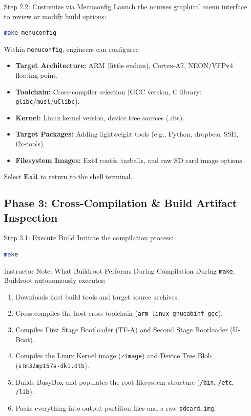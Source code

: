 \begin{cmdbox}{Step 2.2: Customize via Menuconfig}
Launch the ncurses graphical menu interface to review or modify build options:
\begin{lstlisting}[language=bash]
make menuconfig
\end{lstlisting}
Within \texttt{menuconfig}, engineers can configure:
\begin{itemize}[leftmargin=*]
    \item \textbf{Target Architecture:} ARM (little endian), Cortex-A7, NEON/VFPv4 floating point.
    \item \textbf{Toolchain:} Cross-compiler selection (GCC version, C library: \texttt{glibc}/\texttt{musl}/\texttt{uClibc}).
    \item \textbf{Kernel:} Linux kernel version, device tree sources (.dts).
    \item \textbf{Target Packages:} Adding lightweight tools (e.g., Python, dropbear SSH, i2c-tools).
    \item \textbf{Filesystem Images:} Ext4 rootfs, tarballs, and raw SD card image options.
\end{itemize}
Select \textbf{Exit} to return to the shell terminal.
\end{cmdbox}

\subsection{Phase 3: Cross-Compilation \& Build Artifact Inspection}

\begin{cmdbox}{Step 3.1: Execute Build}
Initiate the compilation process:
\begin{lstlisting}[language=bash]
make
\end{lstlisting}
\end{cmdbox}

\begin{tipbox}{Instructor Note: What Buildroot Performs During Compilation}
During \texttt{make}, Buildroot autonomously executes:
\begin{enumerate}[leftmargin=*]
    \item Downloads host build tools and target source archives.
    \item Cross-compiles the host cross-toolchain (\texttt{arm-linux-gnueabihf-gcc}).
    \item Compiles First Stage Bootloader (TF-A) and Second Stage Bootloader (U-Boot).
    \item Compiles the Linux Kernel image (\texttt{zImage}) and Device Tree Blob (\texttt{stm32mp157a-dk1.dtb}).
    \item Builds BusyBox and populates the root filesystem structure (\texttt{/bin}, \texttt{/etc}, \texttt{/lib}).
    \item Packs everything into output partition files and a raw \texttt{sdcard.img}.
\end{enumerate}
\end{tipbox}

